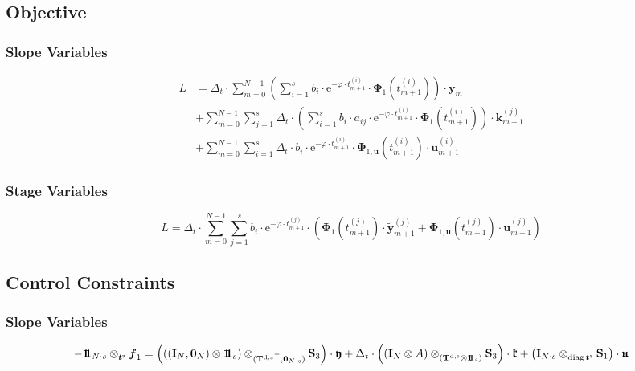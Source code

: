\documentclass{article}
\newcommand{\tp}{\top}%
\newcommand{\kron}{\otimes}%
\newcommand{\dkron}[2][]{\mathbin{\kron_{#2}^{#1}}}%
\newcommand{\expe}{\mathrm{e}}%
\newcommand{\diag}{\mathop{\mathrm{diag}}}%
\newcommand{\vectorfont}[1]{\boldsymbol{#1}}%
\newcommand{\greekvectorfont}[1]{\boldsymbol{#1}}%
\newcommand{\matrixfont}[1]{\mathbf{#1}}%
\newcommand{\fvec}{\vectorfont{f}}
\newcommand{\kvec}{\vectorfont{k}}
\newcommand{\tvec}{\vectorfont{t}}
\newcommand{\uvec}{\vectorfont{u}}
\newcommand{\yvec}{\vectorfont{y}}
\newcommand{\tildeyvec}{\vectorfont{\tilde{y}}}
\newcommand{\Phivec}{\greekvectorfont{\Phi}}
\newcommand{\kfrakvec}{\vectorfont{\mathfrak{k}}}
\newcommand{\ufrakvec}{\vectorfont{\mathfrak{u}}}
\newcommand{\yfrakvec}{\vectorfont{\mathfrak{y}}}
\newcommand{\nullvec}{\greekvectorfont{0}}
\newcommand{\einsvec}{\vectorfont{1}\negthinspace\negthinspace\vectorfont{1}} %
\newcommand{\Imat}{\matrixfont{I}}%
\newcommand{\Smat}{\matrixfont{S}}
\newcommand{\Tmat}{\matrixfont{T}}
\begin{document}
\subsection*{Objective}
\subsubsection*{Slope Variables}
\begin{align*}
L &= \Delta_t \cdot \sum_{m=0}^{N-1} \left(\sum_{i=1}^s b_i \cdot \expe^{-\varphi \cdot t_{m+1}^{(i)}} \cdot \Phivec_1 (t_{m+1}^{(i)}) \right) \cdot \yvec_{m} \\
 &+ \sum_{m=0}^{N-1} \sum_{j=1}^s \Delta_t \cdot \left(\sum_{i=1}^s b_i \cdot a_{ij} \cdot \expe^{-\varphi \cdot t_{m+1}^{(i)}} \cdot \Phivec_1 (t_{m+1}^{(i)}) \right) \cdot \kvec_{m+1}^{(j)} \\
 &+ \sum_{m=0}^{N-1} \sum_{i=1}^s \Delta_t \cdot b_i \cdot \expe^{-\varphi \cdot t_{m+1}^{(i)}} \cdot \Phivec_{1,\uvec}(t_{m+1}^{(i)}) \cdot \uvec_{m+1}^{(i)}
\end{align*}

\subsubsection*{Stage Variables}
\[
L = \Delta_t \cdot \sum_{m=0}^{N-1} \sum_{j=1}^s b_i \cdot \expe^{-\varphi \cdot t_{m+1}^{(j)}} \cdot \left(\Phivec_1(t_{m+1}^{(j)})\cdot \tildeyvec_{m+1}^{(j)} + \Phivec_{1,\uvec}(t_{m+1}^{(j)}) \cdot \uvec_{m+1}^{(j)}\right) 
\]


\subsection*{Control Constraints}
\subsubsection*{Slope Variables}
\[
-\einsvec_{N\cdot s} \dkron{\tvec^{\mathrm{s}}} \fvec_1
 = \left( \left( (\Imat_{N}, \nullvec_N) \kron \einsvec_s\right) \dkron{({\Tmat^{\mathrm{d},\mathrm{s}}}^{\tp},\nullvec_{N \cdot s})} \Smat_3 \right) \cdot \yfrakvec
 + \Delta_t \cdot \left(  (\Imat_{N} \kron A) \dkron{(\Tmat^{\mathrm{d},\mathrm{s}} \kron \einsvec_s)} \Smat_3 \right)\cdot \kfrakvec
 + \left(\Imat_{N \cdot s} \dkron{\diag \tvec^{\mathrm{s}}} \Smat_1  \right) \cdot \ufrakvec
\]
\end{document}
